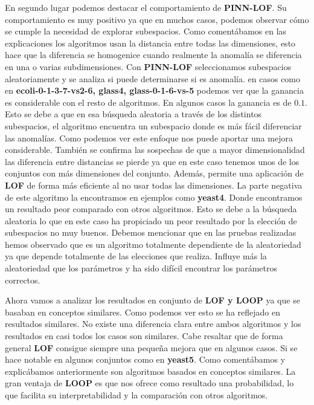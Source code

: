 En segundo lugar podemos destacar el comportamiento de \textbf{PINN-LOF}. Su comportamiento es muy positivo
ya que en muchos casos, podemos observar cómo se cumple la necesidad de explorar subespacios. 
Como comentábamos en las explicaciones los algoritmos usan la distancia entre todas las dimensiones, 
esto hace que la diferencia se homogenice cuando realmente la anomalía se diferencia en una o varias subdimensiones. 
Con \textbf{PINN-LOF} seleccionamos subespacios aleatoriamente y se analiza si puede determinarse si es anomalía. 
en casos como en \textbf{ecoli-0-1-3-7-vs2-6, glass4, glass-0-1-6-vs-5} podemos ver que la ganancia es considerable 
con el resto de algoritmos. En algunos casos la ganancia es de $0.1$. Esto se debe a que en esa búsqueda aleatoria 
a través de los distintos subespacios, el algoritmo encuentra un subespacio donde es más fácil 
diferenciar las anomalías. Como podemos ver este enfoque nos puede aportar una mejora considerable. 
También se confirma las sospechas de que a mayor dimensionalidad las diferencia entre distancias se pierde 
ya que en este caso tenemos unos de los conjuntos con más dimensiones del conjunto.
Además, permite una aplicación de \textbf{LOF} de forma más eficiente al no usar todas las dimensiones.
La parte negativa de este algoritmo la encontramos en ejemplos como \textbf{yeast4}. Donde encontramos 
un resultado peor comparado con otros algoritmos. Esto se debe a la búsqueda aleatoria lo que en este 
caso ha propiciado un peor resultado por la elección de subespacios no muy buenos. Debemos  
mencionar que en las pruebas realizadas hemos observado que es un algoritmo totalmente dependiente de  
la aleatoriedad ya que depende totalmente de las elecciones que realiza. Influye más la aleatoriedad 
que los parámetros y ha sido difícil encontrar los parámetros correctos. 

Ahora vamos a analizar los resultados en conjunto de \textbf{LOF y LOOP} ya que se basaban 
en conceptos similares. Como podemos ver esto se ha reflejado en resultados similares. No existe 
una diferencia clara entre ambos algoritmos y los resultados en casi todos los casos son similares. 
Cabe resaltar que de forma general \textbf{LOF} consigue siempre una pequeña mejora que en algunos 
casos. Si se hace notable en algunos conjuntos como en \textbf{yeast5}. Como comentábamos y explicábamos anteriormente  
son algoritmos basados en conceptos similares. La gran ventaja de \textbf{LOOP} es que nos ofrece 
como resultado una probabilidad, lo que facilita su interpretabilidad y la comparación con otros  
algoritmos. 

